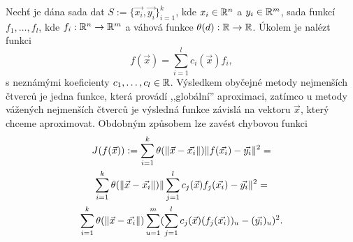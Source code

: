 Nechť je dána sada dat $S := \{\vec{x_i}, \vec{y_i}\}_{i = 1}^k$, kde $x_i \in \mathbb{R}^n$ a $y_i \in \mathbb{R}^m$, sada funkcí $f_1,\ldots,f_l$, kde $f_i: \mathbb{R}^n \rightarrow \mathbb{R}^m$ a váhová funkce $\theta(d): \mathbb{R} \rightarrow \mathbb{R}$. Úkolem je nalézt funkci
\[
  f(\vec{x}) = \sum_{i=1}^lc_i(\vec{x})f_i,
\]
s neznámými koeficienty $c_1,\ldots,c_l \in \mathbb{R}$. Výsledkem obyčejné metody nejmenších čtverců je jedna funkce, která provádí ,,globální'' aproximaci, zatímco u metody vážených nejmenších čtverců je výsledná funkce závislá na vektoru $\vec{x}$, který chceme aproximovat. Obdobným způsobem lze zavést chybovou funkci
\begin{multline}
  \label{defi:wls-min}
  J(f(\vec{x})) := \sum_{i=1}^k \theta(\|\vec{x} - \vec{x_i}\|)\|f(\vec{x_i}) - \vec{y_i}\|^2 =\\
  \sum_{i=1}^k\theta(\|\vec{x} - \vec{x_i}\|)\|\sum_{j=1}^l c_j(\vec{x})f_j(\vec{x_i}) - \vec{y_i}\|^2 =\\
  \sum_{i=1}^k\theta(\|\vec{x} - \vec{x_i}\|)\sum_{u=1}^m(\sum_{j=1}^l c_j(\vec{x})(f_j(\vec{x_i}))_u - (\vec{y_i})_u)^2.\\
\end{multline}

